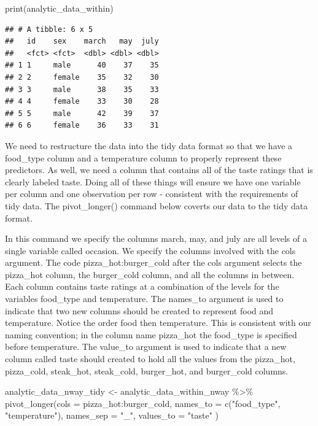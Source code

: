 \documentclass[
]{krantz}
\makeatletter
\newenvironment{Shaded}{\begin{snugshade}}{\end{snugshade}}
\newcommand{\AttributeTok}[1]{\textcolor[rgb]{0.61,0.61,0.61}{#1}}
\newcommand{\FunctionTok}[1]{\textcolor[rgb]{0,0,0}{#1}}
\newcommand{\NormalTok}[1]{#1}
\newcommand{\OtherTok}[1]{\textcolor[rgb]{0.37,0.37,0.37}{#1}}
\newcommand{\SpecialCharTok}[1]{\textcolor[rgb]{0,0,0}{#1}}
\newcommand{\StringTok}[1]{\textcolor[rgb]{0.5,0.5,0.5}{#1}}
\newenvironment{kframe}{%
\medskip{}
\setlength{\fboxsep}{.8em}
 \def\at@end@of@kframe{}%
 \ifinner\ifhmode%
  \def\at@end@of@kframe{\end{minipage}}%
  \begin{minipage}{\columnwidth}%
 \fi\fi%
 \def\FrameCommand##1{\hskip\@totalleftmargin \hskip-\fboxsep
 \colorbox{shadecolor}{##1}\hskip-\fboxsep
     \hskip-\linewidth \hskip-\@totalleftmargin \hskip\columnwidth}%
 \MakeFramed {\advance\hsize-\width
   \@totalleftmargin\z@ \linewidth\hsize
   \@setminipage}}%
 {\par\unskip\endMakeFramed%
 \at@end@of@kframe}
\renewenvironment{Shaded}{\begin{kframe}}{\end{kframe}}
\makeatother
\begin{document}
\begin{Shaded}
\begin{Highlighting}[]
\FunctionTok{print}\NormalTok{(analytic\_data\_within)}
\end{Highlighting}
\end{Shaded}

\begin{verbatim}
## # A tibble: 6 x 5
##   id    sex    march   may  july
##   <fct> <fct>  <dbl> <dbl> <dbl>
## 1 1     male      40    37    35
## 2 2     female    35    32    30
## 3 3     male      38    35    33
## 4 4     female    33    30    28
## 5 5     male      42    39    37
## 6 6     female    36    33    31
\end{verbatim}

We need to restructure the data into the tidy data format so that we have a food\_type column and a temperature column to properly represent these predictors. As well, we need a column that contains all of the taste ratings that is clearly labeled taste. Doing all of these things will ensure we have one variable per column and one observation per row - consistent with the requirements of tidy data. The pivot\_longer() command below coverts our data to the tidy data format.

In this command we specify the columns march, may, and july are all levels of a single variable called occasion. We specify the columns involved with the cols argument. The code pizza\_hot:burger\_cold after the cols argument selects the pizza\_hot column, the burger\_cold column, and all the columns in between. Each column contains taste ratings at a combination of the levels for the variables food\_type and temperature. The names\_to argument is used to indicate that two new columns should be created to represent food and temperature. Notice the order food then temperature. This is consistent with our naming convention; in the column name pizza\_hot the food\_type is specified before temperature. The value\_to argument is used to indicate that a new column called taste should created to hold all the values from the pizza\_hot, pizza\_cold, steak\_hot, steak\_cold, burger\_hot, and burger\_cold columns.

\begin{Shaded}
\begin{Highlighting}[]
\NormalTok{analytic\_data\_nway\_tidy }\OtherTok{\textless{}{-}}\NormalTok{ analytic\_data\_within\_nway }\SpecialCharTok{\%\textgreater{}\%}
  \FunctionTok{pivot\_longer}\NormalTok{(}\AttributeTok{cols =}\NormalTok{ pizza\_hot}\SpecialCharTok{:}\NormalTok{burger\_cold,}
               \AttributeTok{names\_to =} \FunctionTok{c}\NormalTok{(}\StringTok{"food\_type"}\NormalTok{, }\StringTok{"temperature"}\NormalTok{),}
               \AttributeTok{names\_sep =} \StringTok{"\_"}\NormalTok{,}
               \AttributeTok{values\_to =} \StringTok{"taste"}
\NormalTok{  )}
\end{Highlighting}
\end{Shaded}
\end{document}
